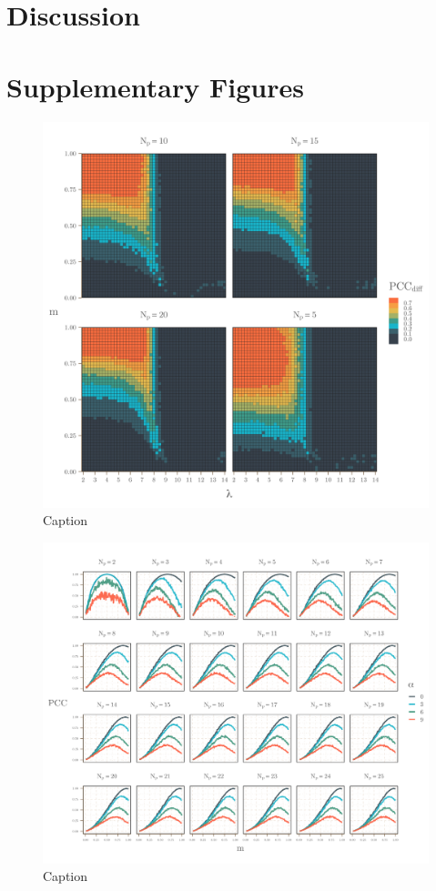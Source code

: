 \documentclass[]{article}
\begin{document}
\section{Discussion}

\clearpage
{
\footnotesize

}

\section{Supplementary Figures}

\begin{figure}[H]
    \centering
    \includegraphics[width=15cm]{figs/vary_npops.png}
 
    \caption{Caption}
    \label{fig:mig_grad}
\end{figure}

\begin{figure}[H]
    \centering
    \includegraphics[width=15cm]{figs/num_pops_facet.png}
    \caption{Caption}
    \label{fig:mig_grad}
\end{figure}
\end{document}

